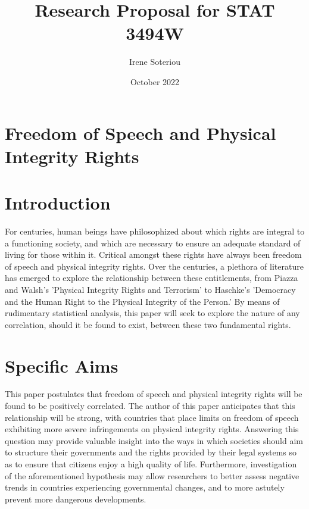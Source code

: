 \documentclass{article}
\title{Research Proposal for STAT 3494W}
\author{Irene Soteriou}
\date{October 2022}
\begin{document}
\maketitle

\section*{Freedom of Speech and Physical Integrity Rights}

\section{Introduction}

For centuries, human beings have philosophized about which rights are integral to a functioning society, and which are necessary to ensure an adequate standard of living for those within it. Critical amongst these rights have always been freedom of speech and physical integrity rights. Over the centuries, a plethora of literature has emerged to explore the relationship between these entitlements, from Piazza and Walsh's 'Physical Integrity Rights and Terrorism' to Haschke's 'Democracy and the Human Right to the Physical Integrity of the Person.' By means of rudimentary statistical analysis, this paper will seek to explore the nature of any correlation, should it be found to exist, between these two fundamental rights. 

\section{Specific Aims}
This paper postulates that freedom of speech and physical integrity rights will be found to be positively correlated. The author of this paper anticipates that this relationship will be strong, with countries that place limits on freedom of speech exhibiting more severe infringements on physical integrity rights. Answering this question may provide valuable insight into the ways in which societies should aim to structure their governments and the rights provided by their legal systems so as to ensure that citizens enjoy a high quality of life. Furthermore, investigation of the aforementioned hypothesis may allow researchers to better assess negative trends in countries experiencing governmental changes, and to more astutely prevent more dangerous developments.
\end{document}
